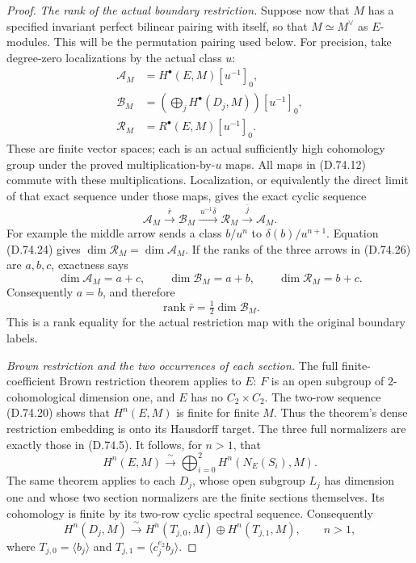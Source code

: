 \begin{proof}
\emph{The rank of the actual boundary restriction.}
Suppose now that $M$ has a specified invariant
perfect bilinear pairing with itself, so that
$M\simeq M^\vee$ as $E$-modules.  This will be the
permutation pairing used below.
For precision, take degree-zero localizations by
the actual class $u$:
\[
 \begin{split}
 \mathcal A_M&=H^\bullet(E,M)[u^{-1}]_0,\\
 \mathcal B_M&=\left(\bigoplus_jH^\bullet(D_j,M)\right)
                                                    [u^{-1}]_0,\\
 \mathcal R_M&=R^\bullet(E,M)[u^{-1}]_0 .
 \end{split}
 \tag{D.74.25}
\]
These are finite vector spaces; each is an actual
sufficiently high cohomology group under the
proved multiplication-by-$u$ maps.  All maps
in (D.74.12) commute with these multiplications.
Localization, or equivalently the direct limit
of that exact sequence under those maps, gives
the exact cyclic sequence
\[
 \mathcal A_M\xrightarrow{\ \bar r\ }\mathcal B_M
       \xrightarrow{\ u^{-1}\bar\delta\ }\mathcal R_M
       \xrightarrow{\ \bar j\ }\mathcal A_M .
 \tag{D.74.26}
\]
For example the middle arrow sends a class
$b/u^n$ to $\delta(b)/u^{n+1}$.
Equation (D.74.24) gives
$\dim\mathcal R_M=\dim\mathcal A_M$.
If the ranks of the three arrows in (D.74.26) are
$a,b,c$, exactness says
\[
 \dim\mathcal A_M=a+c,\qquad
 \dim\mathcal B_M=a+b,\qquad
 \dim\mathcal R_M=b+c .
 \tag{D.74.27}
\]
Consequently $a=b$, and therefore
\[
             \operatorname{rank}\bar r
                         =\tfrac12\dim\mathcal B_M .
 \tag{D.74.28}
\]
This is a rank equality for the actual restriction
map with the original boundary labels.

\emph{Brown restriction and the two occurrences of each section.}
The full finite-coefficient Brown restriction theorem
\cite[Theorem~2 and Section~1.1]
{A-KochloukovaZalesskii2007} applies to $E$:
$F$ is an open subgroup of $2$-cohomological
dimension one, and $E$ has no $C_2\times C_2$.
The two-row sequence (D.74.20) shows that
$H^n(E,M)$ is finite for finite $M$.  Thus the
theorem's dense restriction embedding is onto
its Hausdorff target.  The three full normalizers
are exactly those in (D.74.5).  It follows, for
$n>1$, that
\[
 H^n(E,M)\xrightarrow{\ \sim\ }
                       \bigoplus_{i=0}^2H^n(N_E(S_i),M).
 \tag{D.74.29}
\]
The same theorem applies to each $D_j$, whose
open subgroup $L_j$ has dimension one and whose
two section normalizers are the finite sections
themselves.  Its cohomology is finite by its
two-row cyclic spectral sequence.  Consequently
\[
 H^n(D_j,M)\xrightarrow{\ \sim\ }
           H^n(T_{j,0},M)\oplus H^n(T_{j,1},M),
                    \qquad n>1 ,
 \tag{D.74.30}
\]
where $T_{j,0}=\langle b_j\rangle$ and
$T_{j,1}=\langle c_j^{e_2}b_j\rangle$.


\end{proof}
